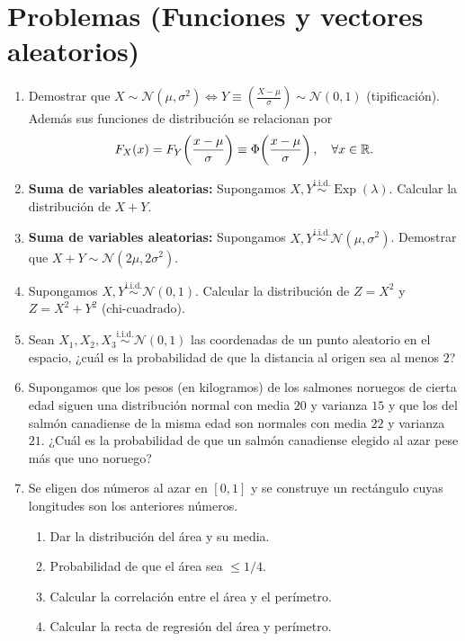 \section{Problemas (Funciones y vectores aleatorios)}

\begin{enumerate}
  \item Demostrar que $X \sim \mathcal{N}(\mu, \sigma^2) \iff Y \equiv \left(\frac{X-\mu}{\sigma}\right) \sim \mathcal{N}(0,1)$ (tipificación). Además sus funciones de distribución se relacionan por
        \begin{equation*}
          F_X(x) = F_Y\!\left(\frac{x-\mu}{\sigma}\right) \equiv \Phi\!\left(\frac{x-\mu}{\sigma}\right), \quad \forall x \in \mathbb{R}.
        \end{equation*}
  \item \textbf{Suma de variables aleatorias:} Supongamos $X, Y \stackrel{\text{i.i.d.}}{\sim} \operatorname{Exp}(\lambda)$. Calcular la distribución de $X + Y$.
  \item \textbf{Suma de variables aleatorias:} Supongamos $X, Y \stackrel{\text{i.i.d.}}{\sim} \mathcal{N}(\mu, \sigma^2)$. Demostrar que $X + Y \sim \mathcal{N}(2\mu, 2\sigma^2)$.
  \item Supongamos $X, Y \stackrel{\text{i.i.d.}}{\sim} \mathcal{N}(0,1)$. Calcular la distribución de $Z = X^2$ y $Z = X^2 + Y^2$ (chi-cuadrado).
  \item Sean $X_1, X_2, X_3 \stackrel{\text{i.i.d.}}{\sim} \mathcal{N}(0,1)$ las coordenadas de un punto aleatorio en el espacio, ¿cuál es la probabilidad de que la distancia al origen sea al menos $2$?
  \item Supongamos que los pesos (en kilogramos) de los salmones noruegos de cierta edad siguen una distribución normal con media $20$ y varianza $15$ y que los del salmón canadiense de la misma edad son normales con media $22$ y varianza $21$. ¿Cuál es la probabilidad de que un salmón canadiense elegido al azar pese más que uno noruego?
  \item Se eligen dos números al azar en $[0, 1]$ y se construye un rectángulo cuyas longitudes son los anteriores números.
        \begin{enumerate}[label=(\alph*)]
          \item Dar la distribución del área y su media.
          \item Probabilidad de que el área sea $\le 1/4$.
          \item Calcular la correlación entre el área y el perímetro.
          \item Calcular la recta de regresión del área y perímetro.

\end{enumerate}
\end{enumerate}
